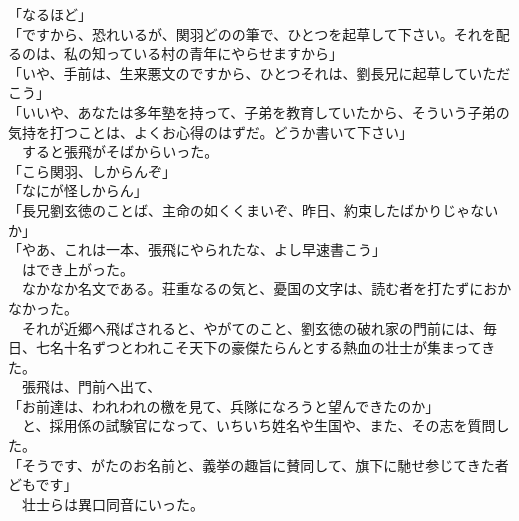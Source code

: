 \documentclass[
  paper=a5,
  fontsize=10pt,
  jafontsize=9.5pt,
  tate,                  %
  open_bracket_pos=nibu, %
]{jlreq}
\begin{document}
「なるほど」\\


「ですから、恐れいるが、関羽どのの筆で、ひとつを起草して下さい。それを配るのは、私の知っている村の青年にやらせますから」\\


「いや、手前は、生来悪文のですから、ひとつそれは、劉長兄に起草していただこう」\\


「いいや、あなたは多年塾を持って、子弟を教育していたから、そういう子弟の気持を打つことは、よくお心得のはずだ。どうか書いて下さい」\\


　すると張飛がそばからいった。\\


「こら関羽、しからんぞ」\\


「なにが怪しからん」\\


「長兄劉玄徳のことば、主命の如くくまいぞ、昨日、約束したばかりじゃないか」\\


「やあ、これは一本、張飛にやられたな、よし早速書こう」\\


　はでき上がった。\\


　なかなか名文である。荘重なるの気と、憂国の文字は、読む者を打たずにおかなかった。\\


　それが近郷へ飛ばされると、やがてのこと、劉玄徳の破れ家の門前には、毎日、七名十名ずつとわれこそ天下の豪傑たらんとする熱血の壮士が集まってきた。\\


　張飛は、門前へ出て、\\


「お前達は、われわれの檄を見て、兵隊になろうと望んできたのか」\\


　と、採用係の試験官になって、いちいち姓名や生国や、また、その志を質問した。\\


「そうです、がたのお名前と、義挙の趣旨に賛同して、旗下に馳せ参じてきた者どもです」\\


　壮士らは異口同音にいった。\\
\end{document}
